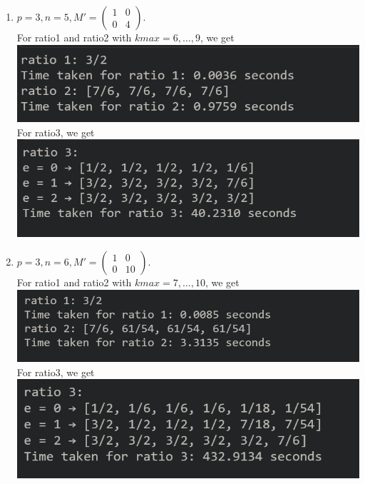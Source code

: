 \documentclass[letterpaper,12pt]{article}
\begin{document}
\begin{enumerate}
\item $p=3, n=5, M' = \begin{pmatrix}
1 & 0 \\ 0 & 4
\end{pmatrix}.$ \\
For ratio1 and ratio2 with $kmax = 6, \dots, 9$, we get \\
\includegraphics[scale=0.5]{ex4_1.png} \\
For ratio3, we get \\
\includegraphics[scale=0.5]{ex4_2.png}

\item $p=3, n=6, M' = \begin{pmatrix}
1 & 0 \\ 0 & 10
\end{pmatrix}.$ \\
For ratio1 and ratio2 with $kmax = 7, \dots, 10$, we get \\
\includegraphics[scale=0.5]{ex5_1.png} \\
For ratio3, we get \\
\includegraphics[scale=0.5]{ex5_2.png}


\end{enumerate}
\end{document}
